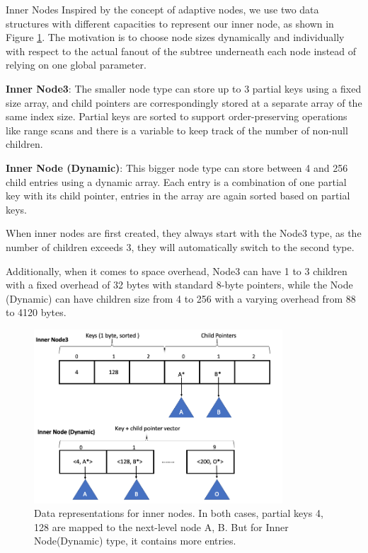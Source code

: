 \documentclass[sigplan,screen,nonacm]{acmart}
\makeatletter
\def\subsubsection{\@startsection{subsubsection}{3}%
  \z@{.5\linespacing\@plus.7\linespacing}{.1\linespacing}%
  {\normalfont\itshape}}
\makeatother
\begin{document}
\subsubsection{Inner Nodes}
\label{sec:inner-nodes}
Inspired by the concept of adaptive nodes, we use two data structures with different capacities to represent our inner node, as shown in Figure \ref{fig:inner-nodes}. The motivation is to choose node sizes dynamically and individually with respect to the actual fanout of the subtree underneath each node instead of relying on one global parameter. 

\textbf {Inner Node3}: The smaller node type can store up to 3 partial keys using a fixed size array, and child pointers are correspondingly stored at a separate array of the same index size. Partial keys are sorted to support order-preserving operations like range scans and there is a variable to keep track of the number of non-null children.

\textbf {Inner Node (Dynamic)}: This bigger node type can store between 4 and 256 child entries using a dynamic array. Each entry is a combination of one partial key with its child pointer, entries in the array are again sorted based on partial keys. 

When inner nodes are first created, they always start with the Node3 type, as the number of children exceeds 3, they will automatically switch to the second type.  

Additionally, when it comes to space overhead, Node3 can have 1 to 3 children with a fixed overhead of 32 bytes with standard 8-byte pointers, while the Node (Dynamic) can have children size from 4 to 256 with a varying overhead from 88 to 4120 bytes. 
\begin{figure}[t]
  \centering
  \includegraphics[width=\linewidth, height=6.5cm]{pic/inner nodes.png}
  \setlength{\belowcaptionskip}{-7pt} 
  \caption{Data representations for inner nodes. In both cases, partial keys 4, 128 are mapped to the next-level node A, B. But for Inner Node(Dynamic) type, it contains more entries.}
  \label{fig:inner-nodes}
\end{figure}
\end{document}
